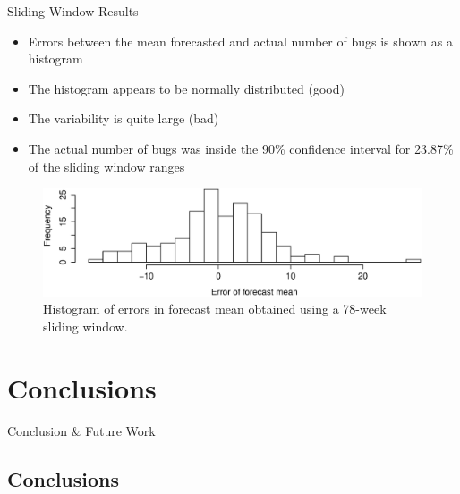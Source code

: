 \documentclass[presentation]{beamer}
\begin{document}
\begin{frame}[t]{Sliding Window Results}
\footnotesize{
\begin{itemize}
\item{Errors between the mean forecasted and actual number of bugs is shown as a histogram}
\item{The histogram appears to be normally distributed (good)}
\item{The variability is quite large (bad)}
\item{The actual number of bugs was inside the 90\% confidence interval for 23.87\% of the sliding window ranges}
\end{itemize}
\vspace{-.5cm}
\begin{figure}[htbp]
\begin{center}
\includegraphics[width=.9\textwidth]{assets/forecast_errors.eps}
\caption{Histogram of errors in forecast mean obtained using a 78-week sliding window.}
\end{center}
\end{figure}
}
\end{frame}


\section{Conclusions}

\begin{frame}
\begin{center}
\Large{Conclusion \& Future Work}
\end{center}
\end{frame}

\subsection{Conclusions}
\end{document}
